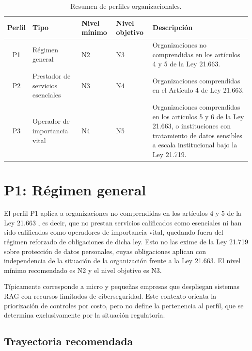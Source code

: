 \begin{table}[H]
  \centering
  \caption{Resumen de perfiles organizacionales.}
  \label{tab:resumen-perfiles}
  \begin{tabularx}{\textwidth}{@{}c l C{2cm} C{2cm} X@{}}
    \toprule
    \textbf{Perfil} & \textbf{Tipo} & \textbf{Nivel mínimo} & \textbf{Nivel objetivo} & \textbf{Descripción} \\
    \midrule
    P1 & Régimen general & N2 & N3 & Organizaciones no comprendidas en los artículos 4 y 5 de la Ley 21.663. \\
    P2 & Prestador de servicios esenciales     & N3 & N4 & Organizaciones comprendidas en el Artículo 4 de Ley 21.663. \\
    P3 & Operador de importancia vital   & N4 & N5 & Organizaciones comprendidas en los artículos 5 y 6 de la Ley 21.663, o instituciones con tratamiento de datos sensibles a escala institucional bajo la Ley 21.719. \\
    \bottomrule
  \end{tabularx}
\end{table}

\section{P1: Régimen general}
\label{sec:perfil-p1}

El perfil P1 aplica a organizaciones no comprendidas en los artículos 4 y 5 de la Ley 21.663 \cite{ley21663}, es decir, que no prestan servicios calificados como esenciales ni han sido calificadas como operadores de importancia vital, quedando fuera del régimen reforzado de obligaciones de dicha ley. Esto no las exime de la Ley 21.719 \cite{ley21719} sobre protección de datos personales, cuyas obligaciones aplican con independencia de la situación de la organización frente a la Ley 21.663. El nivel mínimo recomendado es N2 y el nivel objetivo es N3.

Típicamente corresponde a micro y pequeñas empresas que despliegan sistemas RAG con recursos limitados de ciberseguridad. Este contexto orienta la priorización de controles por costo, pero no define la pertenencia al perfil, que se determina exclusivamente por la situación regulatoria.

\subsection{Trayectoria recomendada}

